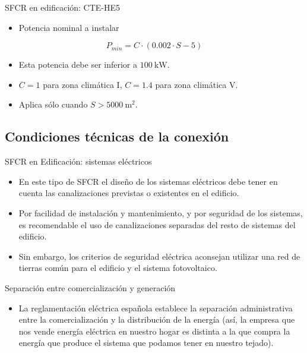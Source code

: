 \documentclass[xcolor={usenames,svgnames,dvipsnames}]{beamer}
\begin{document}
\begin{frame}[label={sec:orgfb869b8}]{SFCR en edificación: CTE-HE5}
\begin{itemize}
\item Potencia \alert{nominal} a instalar
\end{itemize}

$$P_{min}=C\cdot(0.002\cdot S - 5)$$

\begin{itemize}
\item Esta potencia debe ser inferior a \(\SI{100}{\kilo\watt}\).

\item \(C=1\) para zona climática I, \(C=1.4\) para zona climática V.

\item Aplica sólo cuando \(S > \SI{5000}{\meter\squared}\).
\end{itemize}
\end{frame}

\subsection{Condiciones técnicas de la conexión}
\label{sec:orgce843c9}

\begin{frame}[label={sec:org2eba03d}]{SFCR en Edificación: sistemas eléctricos}
\begin{itemize}
\item En este tipo de SFCR el diseño de los sistemas eléctricos debe tener en cuenta las canalizaciones previstas o existentes en el edificio.

\item Por facilidad de instalación y mantenimiento, y por seguridad de los sistemas, es recomendable el uso de canalizaciones separadas del resto de sistemas del edificio.

\item Sin embargo, los criterios de seguridad eléctrica aconsejan utilizar una \alert{red de tierras común} para el edificio y el sistema fotovoltaico.
\end{itemize}
\end{frame}

\begin{frame}[label={sec:org2f7daf2}]{Separación entre comercialización y generación}
\begin{itemize}
\item La reglamentación eléctrica española establece la separación administrativa entre la comercialización y la distribución de la energía (así, la empresa que nos vende energía eléctrica en nuestro hogar es distinta a la que compra la energía que produce el sistema que podamos tener en nuestro tejado).
\end{itemize}
\end{frame}
\end{document}

